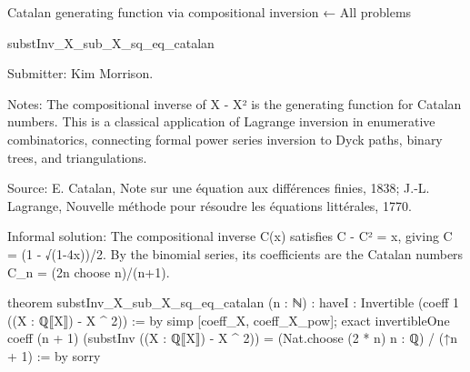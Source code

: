 Catalan generating function via compositional inversion
← All problems

substInv_X_sub_X_sq_eq_catalan

Submitter: Kim Morrison.

Notes: The compositional inverse of X - X² is the generating function for Catalan numbers. This is a classical application of Lagrange inversion in enumerative combinatorics, connecting formal power series inversion to Dyck paths, binary trees, and triangulations.

Source: E. Catalan, Note sur une équation aux différences finies, 1838; J.-L. Lagrange, Nouvelle méthode pour résoudre les équations littérales, 1770.

Informal solution: The compositional inverse C(x) satisfies C - C² = x, giving C = (1 - √(1-4x))/2. By the binomial series, its coefficients are the Catalan numbers C_n = (2n choose n)/(n+1).

theorem substInv_X_sub_X_sq_eq_catalan (n : ℕ) :
    haveI : Invertible (coeff 1 ((X : ℚ⟦X⟧) - X ^ 2)) := by
      simp [coeff_X, coeff_X_pow]; exact invertibleOne
    coeff (n + 1) (substInv ((X : ℚ⟦X⟧) - X ^ 2)) =
      (Nat.choose (2 * n) n : ℚ) / (↑n + 1) := by
  sorry
